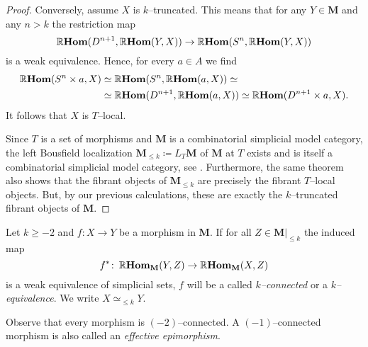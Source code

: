 \begin{proof}
  Conversely, assume \(X\) is \(k\)--truncated. This means that for any \(Y\in\mathbf{M}\) and any \(n>k\) the restriction map
  \[\operatorname{\mathbb{R}\textnormal{\bfseries Hom}}(D^{n+1}, \operatorname{\mathbb{R}\textnormal{\bfseries Hom}}(Y,X)) \to \operatorname{\mathbb{R}\textnormal{\bfseries Hom}}(S^{n}, \operatorname{\mathbb{R}\textnormal{\bfseries Hom}}(Y,X))\]
  is a weak equivalence. Hence, for every \(a\in A\) we find
  \begin{align*}
    \operatorname{\mathbb{R}\textnormal{\bfseries Hom}}(S^{n}\times a, X) &\simeq \operatorname{\mathbb{R}\textnormal{\bfseries Hom}}(S^{n}, \operatorname{\mathbb{R}\textnormal{\bfseries Hom}}(a, X))\simeq \\
    &\simeq \operatorname{\mathbb{R}\textnormal{\bfseries Hom}}(D^{n+1}, \operatorname{\mathbb{R}\textnormal{\bfseries Hom}}(a, X))\simeq \operatorname{\mathbb{R}\textnormal{\bfseries Hom}}(D^{n+1}\times a, X).
  \end{align*}
  It follows that \(X\) is \(T\)--local.

  Since \(T\) is a set of morphisms and \(\mathbf{M}\) is a combinatorial simplicial model category, the left Bousfield localization \(\mathbf{M}_{\leq k} \coloneqq L_{T}\mathbf{M}\) of \(\mathbf{M}\) at \(T\) exists and is itself a combinatorial simplicial model category, see \cite[Prop.~A.3.7.3]{mr2522659}. Furthermore, the same theorem also shows that the fibrant objects of \(\mathbf{M}_{\leq k}\) are precisely the fibrant \(T\)--local objects. But, by our previous calculations, these are exactly the \(k\)--truncated fibrant objects of \(\mathbf{M}\).
\end{proof}

\begin{definition}
  Let \(k\geq -2\) and \(f\colon X\to Y\) be a morphism in \(\mathbf M\). If for all \(Z\in\mathbf M|_{\leq k}\) the induced map
  \[f^{*}\colon \operatorname{\mathbb{R}\textnormal{\bfseries Hom}}_{\mathbf M}(Y, Z) \to \operatorname{\mathbb{R}\textnormal{\bfseries Hom}}_{\mathbf M}(X, Z)\]
  is a weak equivalence of simplicial sets, \(f\) will be a called \emph{\(k\)--connected} or a \emph{\(k\)--equivalence}. We write \(X\simeq_{\leq k} Y\).
\end{definition}

\begin{remark}
  Observe that every morphism is \((-2)\)--connected. A \((-1)\)--connected morphism is also called an \emph{effective epimorphism}.
\end{remark}

